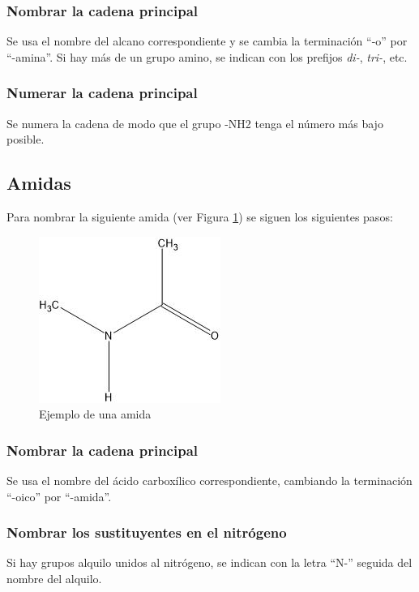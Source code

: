 \documentclass{article}
\begin{document}
\subsubsection{Nombrar la cadena principal}
Se usa el nombre del alcano correspondiente y se cambia la terminación ``-o'' por ``-amina''. Si hay más de un grupo amino, se indican con los prefijos \textit{di-}, \textit{tri-}, etc.

\subsubsection{Numerar la cadena principal}
Se numera la cadena de modo que el grupo -NH2 tenga el número más bajo posible.

\subsection{Amidas}
Para nombrar la siguiente amida (ver Figura \ref{fig:amida}) se siguen los siguientes pasos:
\begin{figure}[h]
    \centering
    \includegraphics[width=0.5\linewidth]{media/metil etil amida.jpg}
    \caption{Ejemplo de una amida}
    \label{fig:amida}
\end{figure}

\subsubsection{Nombrar la cadena principal}
Se usa el nombre del ácido carboxílico correspondiente, cambiando la terminación ``-oico'' por ``-amida''.

\subsubsection{Nombrar los sustituyentes en el nitrógeno}
Si hay grupos alquilo unidos al nitrógeno, se indican con la letra ``N-'' seguida del nombre del alquilo.
\end{document}
